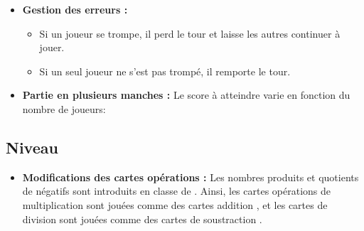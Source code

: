 {\begin{itemize}
        \item\textbf{Gestion des erreurs :}
        \begin{itemize}
            \item Si un joueur se trompe, il perd le tour et laisse les autres continuer à jouer.
            \item Si un seul joueur ne s'est pas trompé, il remporte le tour.
        \end{itemize}

        \item\textbf{Partie en plusieurs manches :}
        Le score à atteindre varie en fonction du nombre de joueurs:\vspace*{-0.45cm}
    \end{itemize}

    \subsection*{Niveau \hypersetup{urlcolor=gradeColor}}
    \begin{itemize}
        \item \textbf{Modifications des cartes opérations :}
        Les nombres produits et quotients de négatifs sont introduits en classe de {\hypersetup{urlcolor=black}}.
        Ainsi, les cartes opérations de multiplication \time sont jouées comme des cartes addition \plus, et les cartes de division \obelus sont jouées comme des cartes de soustraction \minus.
    \end{itemize}

}
